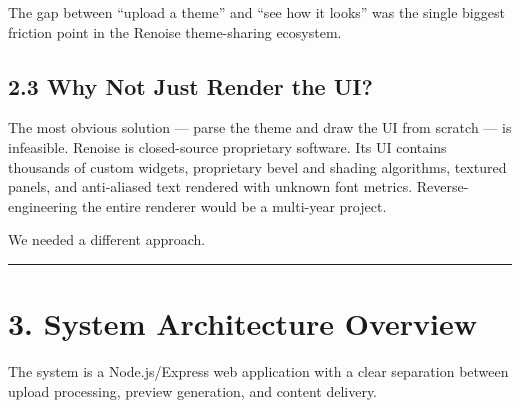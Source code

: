 \documentclass[
  11pt,
  oneside]{report}
\begin{document}
The gap between ``upload a theme'' and ``see how it looks'' was the
single biggest friction point in the Renoise theme-sharing ecosystem.

\subsection{2.3 Why Not Just Render the
UI?}\label{why-not-just-render-the-ui}

The most obvious solution --- parse the theme and draw the UI from
scratch --- is infeasible. Renoise is closed-source proprietary
software. Its UI contains thousands of custom widgets, proprietary bevel
and shading algorithms, textured panels, and anti-aliased text rendered
with unknown font metrics. Reverse-engineering the entire renderer would
be a multi-year project.

We needed a different approach.

\begin{center}\rule{0.5\linewidth}{0.5pt}\end{center}

\section{3. System Architecture
Overview}\label{system-architecture-overview}

The system is a Node.js/Express web application with a clear separation
between upload processing, preview generation, and content delivery.
\end{document}
